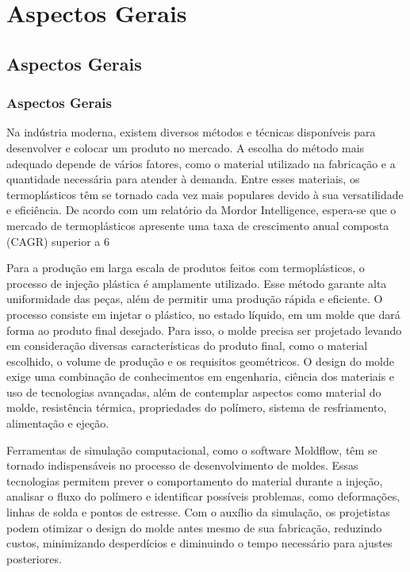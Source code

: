 \part{Aspectos Gerais}

\chapter[Aspectos Gerais]{Aspectos Gerais}
\section{Aspectos Gerais}
Na indústria moderna, existem diversos métodos e técnicas disponíveis para desenvolver e colocar um produto no mercado. A escolha do método mais adequado depende de vários fatores, como o material utilizado na fabricação e a quantidade necessária para atender à demanda. Entre esses materiais, os termoplásticos têm se tornado cada vez mais populares devido à sua versatilidade e eficiência. De acordo com um relatório da Mordor Intelligence, espera-se que o mercado de termoplásticos apresente uma taxa de crescimento anual composta (CAGR) superior a 6%

Para a produção em larga escala de produtos feitos com termoplásticos, o processo de injeção plástica é amplamente utilizado. Esse método garante alta uniformidade das peças, além de permitir uma produção rápida e eficiente. O processo consiste em injetar o plástico, no estado líquido, em um molde que dará forma ao produto final desejado. Para isso, o molde precisa ser projetado levando em consideração diversas características do produto final, como o material escolhido, o volume de produção e os requisitos geométricos. O design do molde exige uma combinação de conhecimentos em engenharia, ciência dos materiais e uso de tecnologias avançadas, além de contemplar aspectos como material do molde, resistência térmica, propriedades do polímero, sistema de resfriamento, alimentação e ejeção.

Ferramentas de simulação computacional, como o software Moldflow, têm se tornado indispensáveis no processo de desenvolvimento de moldes. Essas tecnologias permitem prever o comportamento do material durante a injeção, analisar o fluxo do polímero e identificar possíveis problemas, como deformações, linhas de solda e pontos de estresse. Com o auxílio da simulação, os projetistas podem otimizar o design do molde antes mesmo de sua fabricação, reduzindo custos, minimizando desperdícios e diminuindo o tempo necessário para ajustes posteriores.

